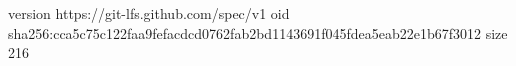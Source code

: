 version https://git-lfs.github.com/spec/v1
oid sha256:cca5c75c122faa9fefacdcd0762fab2bd1143691f045fdea5eab22e1b67f3012
size 216
